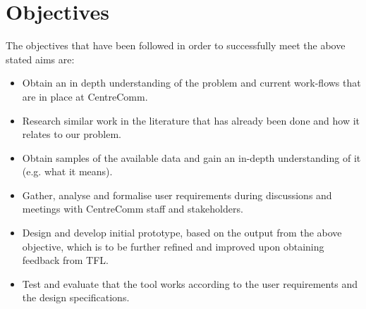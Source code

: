 \section{Objectives}
The objectives that have been followed in order to successfully meet the above stated aims are:
\begin{itemize}
	\item Obtain an in depth understanding of the problem and current work-flows that are in place at CentreComm.
	\item Research similar work in the literature that has already been done and how it relates to our problem.
	\item Obtain samples of the available data and gain an in-depth understanding of it (e.g. what it means).
	\item Gather, analyse and formalise user requirements during discussions and meetings with CentreComm staff and stakeholders.
	\item Design and develop initial prototype, based on the output from the above objective, which is to be further refined and improved upon obtaining feedback from TFL.
	\item Test and evaluate that the tool works according to the user requirements and the design specifications.
\end{itemize}


